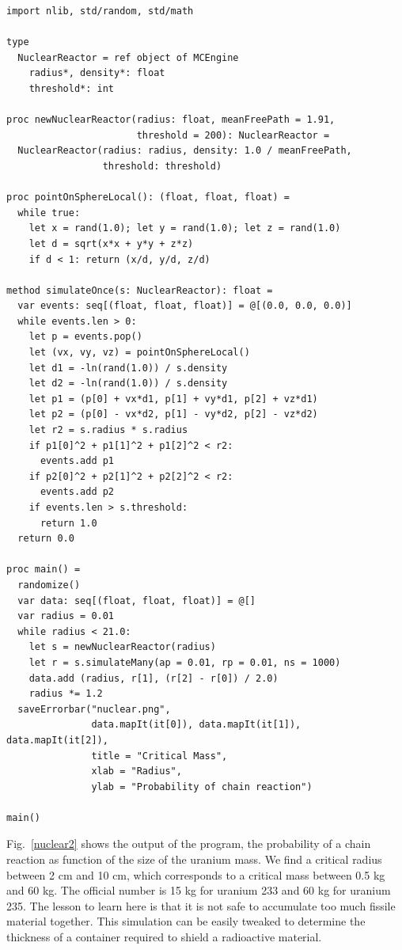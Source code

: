 \documentclass[justified, sixbynine]{tufte-book}
\def\ft{\small\tt}
\theoremstyle{plain}%
\newtheorem * {corollary}{Corollary}
\theoremstyle{definition}
\theoremstyle{remark}
\newtheorem * {remark}{Remark}
\newtheorem * {note}{Note}
\begin{document}
\begin{fullwidth}

\begin{lstlisting}[caption={in file: {\ft nuclear.nim}}]
import nlib, std/random, std/math

type
  NuclearReactor = ref object of MCEngine
    radius*, density*: float
    threshold*: int

proc newNuclearReactor(radius: float, meanFreePath = 1.91,
                       threshold = 200): NuclearReactor =
  NuclearReactor(radius: radius, density: 1.0 / meanFreePath,
                 threshold: threshold)

proc pointOnSphereLocal(): (float, float, float) =
  while true:
    let x = rand(1.0); let y = rand(1.0); let z = rand(1.0)
    let d = sqrt(x*x + y*y + z*z)
    if d < 1: return (x/d, y/d, z/d)

method simulateOnce(s: NuclearReactor): float =
  var events: seq[(float, float, float)] = @[(0.0, 0.0, 0.0)]
  while events.len > 0:
    let p = events.pop()
    let (vx, vy, vz) = pointOnSphereLocal()
    let d1 = -ln(rand(1.0)) / s.density
    let d2 = -ln(rand(1.0)) / s.density
    let p1 = (p[0] + vx*d1, p[1] + vy*d1, p[2] + vz*d1)
    let p2 = (p[0] - vx*d2, p[1] - vy*d2, p[2] - vz*d2)
    let r2 = s.radius * s.radius
    if p1[0]^2 + p1[1]^2 + p1[2]^2 < r2:
      events.add p1
    if p2[0]^2 + p2[1]^2 + p2[2]^2 < r2:
      events.add p2
    if events.len > s.threshold:
      return 1.0
  return 0.0

proc main() =
  randomize()
  var data: seq[(float, float, float)] = @[]
  var radius = 0.01
  while radius < 21.0:
    let s = newNuclearReactor(radius)
    let r = s.simulateMany(ap = 0.01, rp = 0.01, ns = 1000)
    data.add (radius, r[1], (r[2] - r[0]) / 2.0)
    radius *= 1.2
  saveErrorbar("nuclear.png",
               data.mapIt(it[0]), data.mapIt(it[1]), data.mapIt(it[2]),
               title = "Critical Mass",
               xlab = "Radius",
               ylab = "Probability of chain reaction")

main()
\end{lstlisting}

Fig.~\ref{nuclear2} shows the output of the program, the probability of a chain reaction as function of the size of the uranium mass. We find a critical radius between 2 cm and 10 cm, which corresponds to a critical mass between 0.5 kg and 60 kg. The official number is 15 kg for uranium 233 and  60 kg for uranium 235. The lesson to learn here is that it is not safe to accumulate too much fissile material together. This simulation can be easily tweaked to determine the thickness of a container required to shield a radioactive material.


\end{fullwidth}
\end{document}
